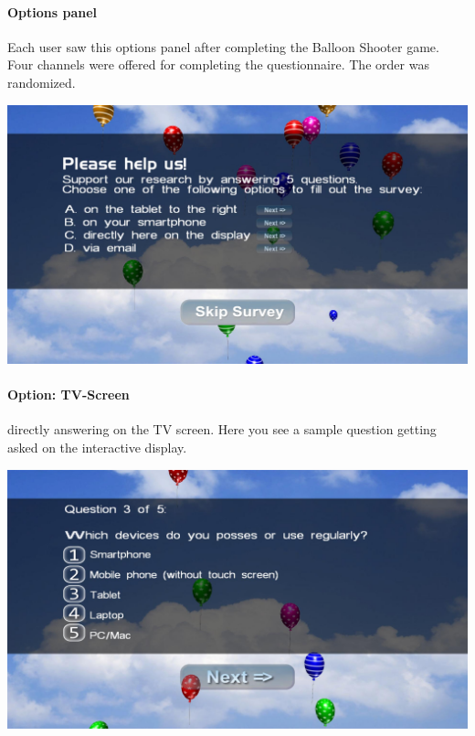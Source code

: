 \paragraph{Options panel}
Each user saw this options panel after completing the Balloon Shooter game. Four channels were offered for completing the questionnaire. The order was randomized.
\label{screenshot:options}
    \begin{center}
        \includegraphics[width=\columnwidth]{img/screenshots/balloon-game/options-overview.jpg}
    \end{center}




\paragraph{Option: TV-Screen}
directly answering on the TV screen. Here you see a sample question getting asked on the interactive display.
 \label{screenshot:tv-option}

\begin{center}
    \includegraphics[width=\columnwidth]{img/screenshots/balloon-game/option-tv.jpg}
\end{center}




